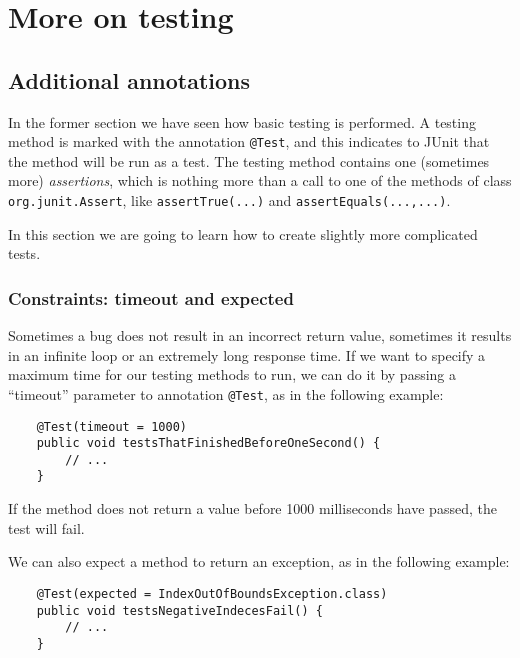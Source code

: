 
%
%
%
%
%


\section{More on testing}
\label{sec:more-testing}

%
%
%

\subsection{Additional annotations}
\label{sec:addit-annot}

In the former section we have seen how basic testing is performed. A
testing method is marked with the annotation \verb+@Test+, and this
indicates to JUnit that the method will be run as a test. The testing
method contains one (sometimes more) \emph{assertions}, which is
nothing more than a call to one of the methods of class
\verb+org.junit.Assert+, like \verb+assertTrue(...)+ 
and \verb+assertEquals(...,...)+. 

In this section we are going to learn how to create slightly more
complicated tests. 

\subsubsection*{Constraints: timeout and expected}
\label{sec:timeout}

Sometimes a bug does not result in an incorrect return value,
sometimes it results in an infinite loop or an extremely long response
time. If we want to specify a maximum time for our testing methods to
run, we can do it by passing a ``timeout'' parameter to annotation
\verb+@Test+, as in the following example: 

\begin{verbatim}
    @Test(timeout = 1000)  
    public void testsThatFinishedBeforeOneSecond() {  
        // ...
    }  
\end{verbatim}

If the method does not return a value before 1000 milliseconds have
passed, the test will fail. 

We can also expect a method to return an exception, as in the
following example: 

\begin{verbatim}
    @Test(expected = IndexOutOfBoundsException.class)
    public void testsNegativeIndecesFail() {  
        // ...
    }  
\end{verbatim}

